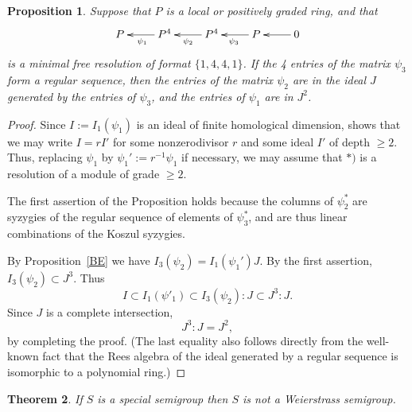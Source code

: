 \documentclass[twoside,12pt, leqno]{amsart}
\newtheorem{theorem}{Theorem}[section]
\newtheorem{proposition}[theorem]{Proposition}
\theoremstyle{definition}
\begin{document}
\begin{proposition}\label{1441}
 Suppose that $P$ is a local or positively graded ring, and that
 $$
 \xymatrix{P &\ar[l]^{\psi_{1}} P^{4}&\ar[l]^{\psi_{2}} P^{4} &\ar[l]^{\psi_{3}} P&\ar[l] 0}
 $$
 is a minimal free resolution of format $\{1,4,4,1\}$. If the 4 entries of the matrix $\psi_{3}$ form a 
 regular sequence, then the entries of the matrix $\psi_{2}$
 are in the ideal $J$ generated by the entries of $\psi_{3}$, 
 and the entries of $\psi_{1}$ are
 in $J^{2}$.
\end{proposition}


\begin{proof} 
Since $I:= I_1(\psi_1)$ is an ideal of finite homological dimension, \cite[Corollary 5.2]{MR340240} shows that
we may write $I = rI'$ for some nonzerodivisor $r$ and
some ideal $I'$ of depth $\geq 2$. Thus, replacing $\psi_{1}$
by $\psi_1' := r^{-1}\psi_{1}$ if necessary, we may assume that $*)$ is a resolution
of a module of grade $\geq 2$.


The first assertion of the Proposition holds because the columns of  $\psi_{2}^{*}$ are
syzygies of the regular sequence of elements of $\psi_{3}^{*}$, 
and are thus linear combinations of the Koszul syzygies. 

By  Proposition~\ref{BE} we have
$I_{3}(\psi_2)= I_{1}(\psi_1') J$. By the first assertion, $ I_{3}(\psi_2)\subset J^{3}$. Thus
$$
I \subset I_{1}(\psi'_1) \subset I_{3}(\psi_2):J\subset J^{3}:J.
$$
Since $J$ is a complete intersection,
 $$
 J^3:J = J^{2},
 $$
 by \cite[Exercise 17.13 e)]{MR1322960}
 completing the proof. (The last equality also follows directly from the well-known fact that the Rees algebra
 of the ideal generated by a regular sequence is isomorphic to a polynomial ring.) 
 \end{proof}

 
\begin{theorem}\label{main}
 If $S$ is a special semigroup  then $S$ is not a Weierstrass semigroup.
\end{theorem}
\end{document}
